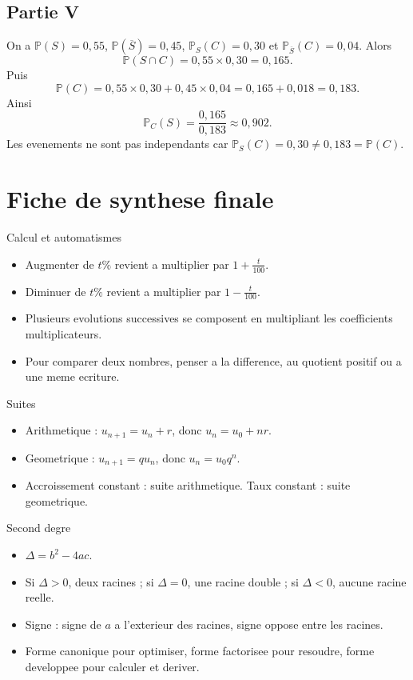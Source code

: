 \documentclass[11pt,a4paper]{article}
\newcommand{\Pp}{\mathbb{P}}
\begin{document}
\subsection*{Partie V}
On a $\Pp(S)=0,55$, $\Pp(\overline S)=0,45$, $\Pp_S(C)=0,30$ et $\Pp_{\overline S}(C)=0,04$. Alors
\[
\Pp(S\cap C)=0,55\times0,30=0,165.
\]
Puis
\[
\Pp(C)=0,55\times0,30+0,45\times0,04=0,165+0,018=0,183.
\]
Ainsi
\[
\Pp_C(S)=\frac{0,165}{0,183}\approx0,902.
\]
Les evenements ne sont pas independants car $\Pp_S(C)=0,30\ne0,183=\Pp(C)$.

\newpage
\section{Fiche de synthese finale}

\begin{boiteretenir}{Calcul et automatismes}
\begin{itemize}
  \item Augmenter de $t\%$ revient a multiplier par $1+\frac t{100}$.
  \item Diminuer de $t\%$ revient a multiplier par $1-\frac t{100}$.
  \item Plusieurs evolutions successives se composent en multipliant les coefficients multiplicateurs.
  \item Pour comparer deux nombres, penser a la difference, au quotient positif ou a une meme ecriture.
\end{itemize}
\end{boiteretenir}

\begin{boiteretenir}{Suites}
\begin{itemize}
  \item Arithmetique : $u_{n+1}=u_n+r$, donc $u_n=u_0+nr$.
  \item Geometrique : $u_{n+1}=qu_n$, donc $u_n=u_0q^n$.
  \item Accroissement constant : suite arithmetique. Taux constant : suite geometrique.
\end{itemize}
\end{boiteretenir}

\begin{boiteretenir}{Second degre}
\begin{itemize}
  \item $\Delta=b^2-4ac$.
  \item Si $\Delta>0$, deux racines ; si $\Delta=0$, une racine double ; si $\Delta<0$, aucune racine reelle.
  \item Signe : signe de $a$ a l'exterieur des racines, signe oppose entre les racines.
  \item Forme canonique pour optimiser, forme factorisee pour resoudre, forme developpee pour calculer et deriver.
\end{itemize}
\end{boiteretenir}
\end{document}
